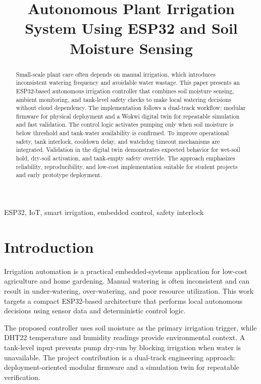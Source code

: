 \documentclass[conference]{IEEEtran}
\title{Autonomous Plant Irrigation System Using ESP32 and Soil Moisture Sensing}
\author{\IEEEauthorblockN{Niroop Baliji}
\IEEEauthorblockA{Department of Automobile Engineering\\
VNR VJIET\\
Hyderabad, India\\
Email: your.email@example.com}}
\begin{document}
\maketitle

\begin{abstract}
Small-scale plant care often depends on manual irrigation, which introduces inconsistent watering frequency and avoidable water wastage. This paper presents an ESP32-based autonomous irrigation controller that combines soil moisture sensing, ambient monitoring, and tank-level safety checks to make local watering decisions without cloud dependency. The implementation follows a dual-track workflow: modular firmware for physical deployment and a Wokwi digital twin for repeatable simulation and fast validation. The control logic activates pumping only when soil moisture is below threshold and tank-water availability is confirmed. To improve operational safety, tank interlock, cooldown delay, and watchdog timeout mechanisms are integrated. Validation in the digital twin demonstrates expected behavior for wet-soil hold, dry-soil activation, and tank-empty safety override. The approach emphasizes reliability, reproducibility, and low-cost implementation suitable for student projects and early prototype deployment.
\end{abstract}

\begin{IEEEkeywords}
ESP32, IoT, smart irrigation, embedded control, safety interlock
\end{IEEEkeywords}

\section{Introduction}
Irrigation automation is a practical embedded-systems application for low-cost agriculture and home gardening. Manual watering is often inconsistent and can result in under-watering, over-watering, and poor resource utilization. This work targets a compact ESP32-based architecture that performs local autonomous decisions using sensor data and deterministic control logic.

The proposed controller uses soil moisture as the primary irrigation trigger, while DHT22 temperature and humidity readings provide environmental context. A tank-level input prevents pump dry-run by blocking irrigation when water is unavailable. The project contribution is a dual-track engineering approach: deployment-oriented modular firmware and a simulation twin for repeatable verification.
\end{document}
